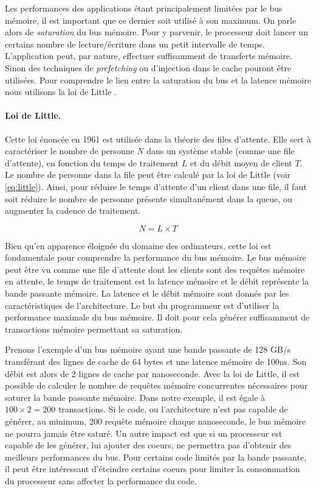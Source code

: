 Les performances des applications étant principalement limitées par le bus mémoire, il est important que ce dernier soit utilisé à son maximum. On parle alors de \textit{saturation} du bus mémoire. Pour y parvenir, le processeur doit lancer un certains nombre de lecture/écriture dans un petit intervalle de temps. L'application peut, par nature, effectuer suffisamment de transferts mémoire. Sinon des techniques de \textit{prefetching} ou d'injection dans le cache pouront être utilisées. Pour comprendre le lien entre la saturation du bus et la latence mémoire nous utilisons la loi de Little \cite{Little_1961}.

\paragraph{Loi de Little.}\label{sec:loidelittle} Cette loi énoncée en 1961 est utilisée dans la théorie des files d'attente. Elle sert à caractériser le nombre de personne $N$ dans un système stable (comme une file d'attente), en fonction du temps de traitement $L$ et du débit moyen de client $T$. Le nombre de personne dans la file peut être calculé par la loi de Little (voir \autoref{eq:little}). Ainsi, pour réduire le temps d'attente d'un client dans une file, il faut soit réduire le nombre de personne présente simultanément dans la queue, ou augmenter la cadence de traitement.

\begin{equation} \label{eq:little}
    N = L \times T
\end{equation}


Bien qu'en apparence éloignée du domaine des ordinateurs, cette loi est fondamentale pour comprendre la performance du bus mémoire. Le bus mémoire peut être vu comme une file d'attente dont les clients sont des requêtes mémoire en attente, le temps de traitement est la latence mémoire et le débit représente la bande passante mémoire. La latence et le débit mémoire sont donnés par les caractéristiques de l'architecture. Le but du programmeur est d'utiliser la performance maximale du bus mémoire. Il doit pour cela générer suffisamment de transactions mémoire permettant sa saturation.

Prenons l'exemple d'un bus mémoire ayant une bande passante de 128 GB/s transférant des lignes de cache de 64 bytes et une latence mémoire de 100ns. Son débit est alors de 2 lignes de cache par nanoseconde. Avec la loi de Little, il est possible de calculer le nombre de requêtes mémoire concurrentes nécessaires pour saturer la bande passante mémoire. Dans notre exemple, il est égale à $100 \times 2 = 200$ transactions. 
Si le code, ou l’architecture n’est pas capable de générer, au minimum, 200 requête mémoire chaque nanoseconde, le bus mémoire ne pourra jamais être saturé. Un autre impact est que si un processeur est capable de les générer, lui ajouter des coeurs, ne permettra pas d’obtenir des meilleurs performances du bus. Pour certains code limités par la bande passante, il peut être intéressant d’éteindre certains coeurs pour limiter la consommation du processeur sans affecter la performance du code.


